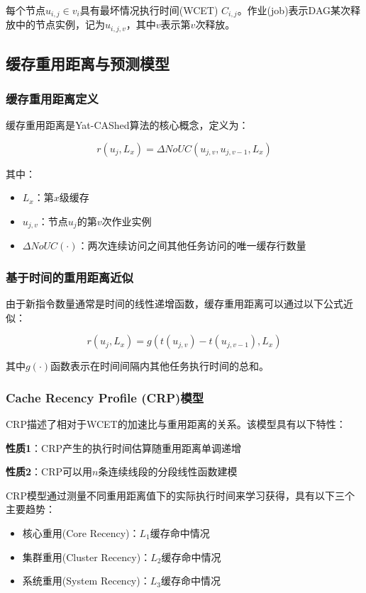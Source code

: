 \documentclass[12pt]{article}
\begin{document}
每个节点$u_{i,j} \in v_i$具有最坏情况执行时间(WCET) $C_{i,j}$。作业(job)表示DAG某次释放中的节点实例，记为$u_{i,j,v}$，其中$v$表示第$v$次释放。

\subsection{缓存重用距离与预测模型}

\subsubsection{缓存重用距离定义}

缓存重用距离是Yat-CAShed算法的核心概念，定义为：

$$r(u_j, L_x) = \Delta NoUC(u_{j,v}, u_{j,v-1}, L_x)$$

其中：
\begin{itemize}
    \item $L_x$：第$x$级缓存
    \item $u_{j,v}$：节点$u_j$的第$v$次作业实例
    \item $\Delta NoUC(\cdot)$：两次连续访问之间其他任务访问的唯一缓存行数量
\end{itemize}

\subsubsection{基于时间的重用距离近似}

由于新指令数量通常是时间的线性递增函数，缓存重用距离可以通过以下公式近似：

$$r(u_j, L_x) = g(t(u_{j,v}) - t(u_{j,v-1}), L_x)$$

其中$g(\cdot)$函数表示在时间间隔内其他任务执行时间的总和。

\subsubsection{Cache Recency Profile (CRP)模型}

CRP描述了相对于WCET的加速比与重用距离的关系。该模型具有以下特性：

\textbf{性质1}：CRP产生的执行时间估算随重用距离单调递增

\textbf{性质2}：CRP可以用$n$条连续线段的分段线性函数建模

CRP模型通过测量不同重用距离值下的实际执行时间来学习获得，具有以下三个主要趋势：
\begin{itemize}
    \item 核心重用(Core Recency)：$L_1$缓存命中情况
    \item 集群重用(Cluster Recency)：$L_2$缓存命中情况  
    \item 系统重用(System Recency)：$L_3$缓存命中情况
\end{itemize}
\end{document}
